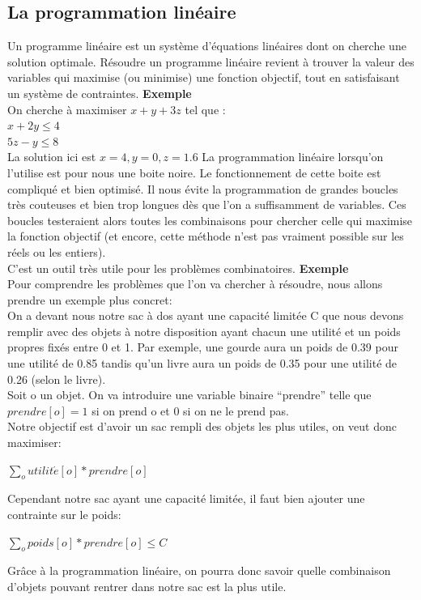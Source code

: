 \documentclass[a4paper]{article}
\begin{document}
\subsection{La programmation linéaire}
  Un programme linéaire est un système d’équations linéaires dont on cherche une solution optimale. Résoudre un programme linéaire revient à trouver la valeur des variables qui maximise (ou minimise) une fonction objectif, tout en satisfaisant un système de contraintes.
\vspace{1\baselineskip}
\textbf{Exemple}\\
  On cherche à maximiser $x + y + 3z$ tel que : \\
  $x + 2y \leq 4$\\
  $5z - y \leq 8$\\
  La solution ici est $x = 4, y = 0, z = 1.6$
\vspace{1\baselineskip}
La programmation linéaire lorsqu'on l'utilise est pour nous une boite noire. Le fonctionnement de cette boite est compliqué et bien optimisé. Il nous évite la programmation de grandes boucles très couteuses et bien trop longues dès que l'on a suffisamment de variables. Ces boucles testeraient alors toutes les combinaisons pour chercher celle qui maximise la fonction objectif (et encore, cette méthode n'est pas vraiment possible sur les réels ou les entiers).\\
C'est un outil très utile pour les problèmes combinatoires.
\vspace{1\baselineskip}
\textbf{Exemple}\\
  Pour comprendre les problèmes que l'on va chercher à résoudre, nous allons prendre un exemple plus concret:\vspace{1\baselineskip} \\
  On a devant nous notre sac à dos ayant une capacité limitée C que nous devons remplir avec des objets à notre disposition ayant chacun une utilité et un poids propres fixés entre 0 et 1. Par exemple, une gourde aura un poids de 0.39 pour une utilité de 0.85 tandis qu'un livre aura un poids de 0.35 pour une utilité de 0.26 (selon le livre).\vspace{1\baselineskip}\\
  Soit o un objet. On va introduire une variable binaire ``prendre'' telle que $prendre[o]=1$ si on prend o et 0 si on ne le prend pas. \\
  Notre objectif est d'avoir un sac rempli des objets les plus utiles, on veut donc maximiser:
  \begin{center}
    $\sum_o utilit\acute{e}[o] * prendre[o]$
  \end{center}
  Cependant notre sac ayant une capacité limitée, il faut bien ajouter une contrainte sur le poids:
  \begin{center}
    $\sum_o poids[o] * prendre[o] \leq C$
  \end{center}
  Grâce à la programmation linéaire, on pourra donc savoir quelle combinaison d'objets pouvant rentrer dans notre sac est la plus utile.
\newpage
\end{document}
